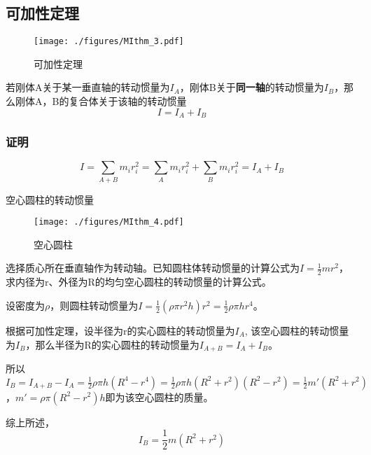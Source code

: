 \subsection{可加性定理}
\begin{figure}[ht]
\centering
\texttt{[image: ./figures/MIthm\_3.pdf]}
\caption{可加性定理} \label{MIthm_fig3}
\end{figure}
若刚体A关于某一垂直轴的转动惯量为$I_A$，刚体B关于\textbf{同一轴}的转动惯量为$I_B$，那么刚体A，B的复合体关于该轴的转动惯量
\begin{equation}
I=I_A+I_B
\end{equation}

\subsubsection{证明}
\begin{equation}
I=\sum_{A+B} m_i r_i^2=\sum_{A} m_i r_i^2 +\sum_B m_i r_i^2 = I_A+I_B
\end{equation}

\begin{example}{空心圆柱的转动惯量}
\begin{figure}[ht]
\centering
\texttt{[image: ./figures/MIthm\_4.pdf]}
\caption{空心圆柱} \label{MIthm_fig4}
\end{figure}
选择质心所在垂直轴作为转动轴。已知圆柱体转动惯量的计算公式为$I=\frac{1}{2}mr^2$，求内径为r、外径为R的均匀空心圆柱的转动惯量的计算公式。

设密度为$\rho$，则圆柱转动惯量为$I=\frac{1}{2}(\rho \pi r^2 h) r^2=\frac{1}{2}\rho \pi h r^4$。

根据可加性定理，设半径为r的实心圆柱的转动惯量为$I_A$, 该空心圆柱的转动惯量为$I_B$，那么半径为R的实心圆柱的转动惯量为$I_{A+B}=I_A+I_B$。

所以$I_B=I_{A+B}-I_A=\frac{1}{2}\rho \pi h (R^4-r^4)=\frac{1}{2}\rho \pi h (R^2+r^2)(R^2-r^2)=\frac{1}{2}m'(R^2+r^2)$，$m'=\rho \pi (R^2-r^2) h$即为该空心圆柱的质量。

综上所述，
\begin{equation}
I_B=\frac{1}{2}m(R^2+r^2)
\end{equation}
\end{example}
